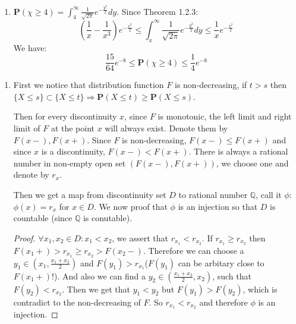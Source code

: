 \documentclass[11pt]{article}
\newcommand{\prob}[1]{\textbf{P} \left( #1 \right)}
\begin{document}
\begin{enumerate}[1.2.2]
    \item
    $\prob{\chi \ge 4} = \int_4^\infty \frac{1}{\sqrt{2\pi}} e^{-\frac{y^2}{2}} d y$. Since Theorem 1.2.3:
    $$(\frac{1}{x} - \frac{1}{x^3})e^{-\frac{x^2}{2}} \le \int_x^\infty \frac{1}{\sqrt{2\pi}}e^{-\frac{y^2}{2}} d y \le \frac{1}{x}e^{-\frac{x^2}{2}}$$
    We have:
    $$\frac{15}{64}e^{-8} \le \prob{\chi \ge 4} \le \frac{1}{4} e^{-8}$$
\end{enumerate}

\begin{enumerate}[1.2.3]
    \item
    First we notice that distribution function $F$ is non-decreasing, if $t > s$ then $\{X \le s\} \subset \{X \le t\} \Rightarrow \prob{X\le t} \ge \prob{X \le s}$.
    
    Then for every discontinuity $x$, since $F$ is monotonic, the left limit and right limit of $F$ at the point $x$ will always exist.
    Denote them by $F(x-), F(x+)$. Since $F$ is non-decreasing, $F(x-) \le F(x+)$ and since $x$ is a discontinuity, $F(x-) < F(x+)$. There is always a rational number in non-empty open set $(F(x-), F(x+))$, we choose one and denote by $r_x$.
    
    Then we get a map from discontinuity set $D$ to rational number $\mathbb{Q}$, call it $\phi$: $\phi(x) = r_x$ for $x \in D$.
    We now proof that $\phi$ is an injection so that $D$ is countable (since $\mathbb{Q}$ is conutable).
    \begin{proof}
        $\forall x_1,x_2 \in D: x_1 < x_2$, we assert that $r_{x_1} < r_{x_2}$. If $r_{x_1} \ge r_{x_2}$ then $F(x_1 +) > r_{x_1} \ge r_{x_2} > F(x_2 -)$. Therefore we can choose a $y_1 \in (x_1,\frac{x_1+x_2}{2})$ and $F(y_1) > r_{x_1}$($F(y_1)$ can be arbitary close to $F(x_1+)$!).
        And also we can find a $y_2 \in (\frac{x_1+x_2}{2}, x_2)$, such that $F(y_2) < r_{x_2}$. Then we get that $y_1 < y_2$ but $F(y_1) > F(y_2)$, which is contradict to the non-decreasing of $F$. So $r_{x_1} < r_{x_2}$ and therefore $\phi$ is an injection.
    \end{proof}
\end{enumerate}
\end{document}
